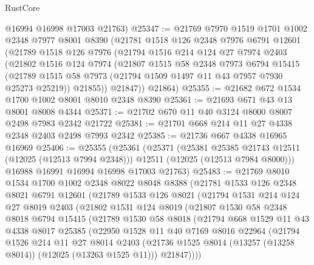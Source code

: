 \begin{lexlean}{RustCore}
\begin{coremodule}
      @16994
      @16998
      @17003
      @21763)
@25347 := @21769
    @7970
    @1519
    @1701
    @1002
    @2348
    @7977
    @8001
    @8390
    (@21781
      @1518
      @126
      @2348
      @7976
      @6791
      @12601
      (@21789
        @1518
        @126
        @7976
        (@21794
          @1516
          @214
          @124
          @27
          @7974
          @2403
          (@21802
            @1516
            @124
            @7974
            (@21807
              @1515
              @58
              @2348
              @7973
              @6794
              @15415
              (@21789 @1515 @58 @7973 (@21794 @1509 @1497 @11 @43 @7957 @7930 @25273 @25219))
              @21855))
          @21847))
      @21864)
@25355 := @21682 @672 @1534 @1700 @1002 @8001 @8010 @2348 @8390
@25361 := @21693 @671 @43 @13 @8001 @8008 @4344
@25371 := @21702 @670 @11 @40 @3124 @8000 @8007 @2498 @7983 @2342 @21722
@25381 := @21701 @668 @214 @11 @27 @4338 @2348 @2403 @2498 @7993 @2342
@25385 := @21736 @667 @4338 @16965 @16969
@25406 := @25355
    (@25361
      (@25371
        (@25381 @25385 @21743 @12511 (@12025 (@12513 @7994 @2348)))
        @12511
        (@12025 (@12513 @7984 @8000)))
      @16988
      @16991
      @16994
      @16998
      @17003
      @21763)
@25483 := @21769
    @8010
    @1534
    @1700
    @1002
    @2348
    @8022
    @8048
    @8388
    (@21781
      @1533
      @126
      @2348
      @8021
      @6791
      @12601
      (@21789
        @1533
        @126
        @8021
        (@21794
          @1531
          @214
          @124
          @27
          @8019
          @2403
          (@21802
            @1531
            @124
            @8019
            (@21807
              @1530
              @58
              @2348
              @8018
              @6794
              @15415
              (@21789
                @1530
                @58
                @8018
                (@21794
                  @668
                  @1529
                  @11
                  @43
                  @4338
                  @8017
                  @25385
                  (@22950
                    @1528
                    @11
                    @40
                    @7169
                    @8016
                    @22964
                    (@21794
                      @1526
                      @214
                      @11
                      @27
                      @8014
                      @2403
                      (@21736 @1525 @8014 (@13257 (@13258 @8014)) (@12025 (@13263 @1525 @11)))
                      @21847))))

\end{coremodule}
\end{lexlean}
